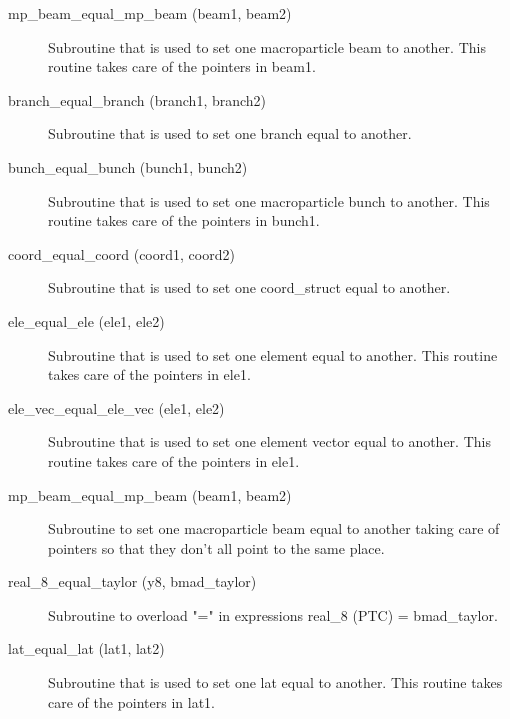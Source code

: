 \begin{description}

\label{r:beam.equal.beam}
\item[mp_beam_equal_mp_beam (beam1, beam2)] \Newline
Subroutine that is used to set one macroparticle beam to another. This routine
takes care of the pointers in beam1.

\label{r:branch.equal.branch}
\item[branch_equal_branch (branch1, branch2)] \Newline 
Subroutine that is used to set one branch equal to another. 

\label{r:bunch.equal.bunch}
\item[bunch_equal_bunch (bunch1, bunch2)] \Newline
Subroutine that is used to set one macroparticle bunch to another. This routine
takes care of the pointers in bunch1.

\label{r:coord.equal.coord}
\item[coord_equal_coord (coord1, coord2)] \Newline
Subroutine that is used to set one coord_struct equal to another. 

\label{r:ele.equal.ele}
\item[ele_equal_ele (ele1, ele2)] \Newline
Subroutine that is used to set one element equal to another. 
This routine takes care of the pointers in ele1. 

\label{r:ele.vec.equal.ele.vec}
\item[ele_vec_equal_ele_vec (ele1, ele2)] \Newline
Subroutine that is used to set one element vector equal to another. 
This routine takes care of the pointers in ele1. 

\label{r:mp.beam.equal.mp.beam}
\item[mp_beam_equal_mp_beam (beam1, beam2)] \Newline 
Subroutine to set one macroparticle beam equal to another taking care of
pointers so that they don't all point to the same place.

\item[real_8_equal_taylor (y8, bmad_taylor)] \Newline
Subroutine to overload "=" in expressions real_8 (PTC) = bmad_taylor.

\label{r:lat.equal.lat}
\item[lat_equal_lat (lat1, lat2)] \Newline
Subroutine that is used to set one lat equal to another. 
This routine takes care of the pointers in lat1. 


\end{description}
